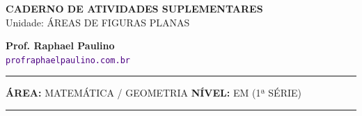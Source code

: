 \documentclass[twoside, 10pt, a4paper]{article}
\begin{document}
\thispagestyle{empty}
\color{Cinzablack}
\vspace*{-1.8cm}

\noindent
\begin{minipage}{\textwidth}
    \selectfont
    \noindent
    \begin{minipage}[t]{0.70\linewidth}
        {\Large \bfseries \MakeUppercase{Caderno de Atividades Suplementares}}\\[0.1cm]
        {\large \textmd{\textcolor{CinzaEscuro}{Unidade: ÁREAS DE FIGURAS PLANAS}}}
    \end{minipage}%
    \begin{minipage}[t]{0.30\linewidth}
        \raggedleft
        \small \textbf{Prof. Raphael Paulino}\\
        \textsf{\small \textcolor{indigo}{\texttt{profraphaelpaulino.com.br}}}
    \end{minipage}
    
    \vspace{0.15cm}
    \noindent\rule{\linewidth}{1.2pt}
    \vspace{-0.1cm}
    \footnotesize\textsf{\textbf{ÁREA:} MATEMÁTICA / GEOMETRIA \hfill \textbf{NÍVEL:} EM (1ª SÉRIE)}
    \vspace{0.1cm}
    \noindent\rule{\linewidth}{0.4pt}
\end{minipage}
\end{document}
